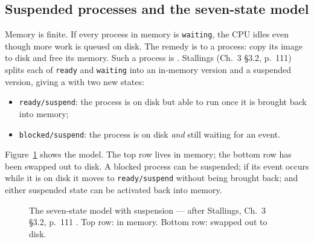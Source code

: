 \documentclass[11pt]{article}
\begin{document}
\subsection{Suspended processes and the seven-state model}

Memory is finite. If every process in memory is \texttt{waiting}, the CPU idles
even though more work is queued on disk. The remedy is to  a
process: copy its image to disk and free its memory. Such a process is
. Stallings (Ch.~3 \S3.2, p.~111) splits each of \texttt{ready}
and \texttt{waiting} into an in-memory version and a suspended version, giving
a  with two new states:

\begin{itemize}
  \item \texttt{ready/suspend}: the process is on disk but able to run once it
        is brought back into memory;
  \item \texttt{blocked/suspend}: the process is on disk \emph{and} still
        waiting for an event.
\end{itemize}

Figure~\ref{fig:seven-state} shows the model. The top row lives in memory; the
bottom row has been swapped out to disk. A blocked process can be suspended;
if its event occurs while it is on disk it moves to \texttt{ready/suspend}
without being brought back; and either suspended state can be activated back
into memory.

\begin{figure}[h]
\centering
{}
\caption{The seven-state model with suspension --- after Stallings, Ch.~3
\S3.2, p.~111 \cite{StallingsOS_internals_design_principles}. Top row: in
memory. Bottom row: swapped out to disk.}
\label{fig:seven-state}
\end{figure}
\end{document}
